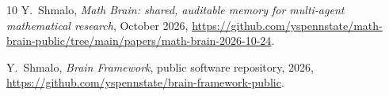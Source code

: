 \documentclass[11pt]{amsart}
\theoremstyle{remark}\newtheorem{remark}[theorem]{Remark}
\begin{document}
\begin{thebibliography}{10}
 Y.~Shmalo, \emph{Math Brain: shared, auditable memory for multi-agent mathematical research}, October 2026, \url{https://github.com/yspennstate/math-brain-public/tree/main/papers/math-brain-2026-10-24}.

 Y.~Shmalo, \emph{Brain Framework}, public software repository, 2026, \url{https://github.com/yspennstate/brain-framework-public}.

\end{thebibliography}
\end{document}
